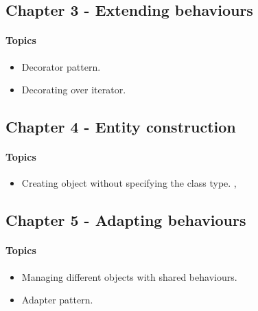 \subsection{Chapter 3 - Extending behaviours}
\paragraph*{Topics}			
\begin{itemize}
	\item Decorator pattern. 
	\item Decorating over iterator. 
\end{itemize}


\subsection{Chapter 4 - Entity construction}
\paragraph*{Topics}			
\begin{itemize}
	\item Creating object without specifying the class type. , 
\end{itemize}


\subsection{Chapter 5 - Adapting behaviours}
\paragraph*{Topics}			
\begin{itemize}
	\item Managing different objects with shared behaviours. 
	\item Adapter pattern. 
\end{itemize}